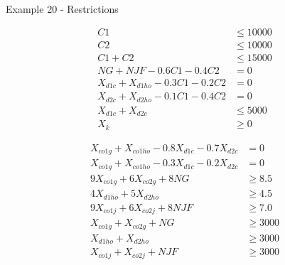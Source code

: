 \begin{frame}{Example 20 - Restrictions}

\begin{multicols}{2}
\tiny{
\begin{align*}
    C1 &\le 10000 \\
    C2 &\le 10000 \\
    C1 + C2 &\le 15000 \\
    NG + NJF - 0.6C1 - 0.4C2 &= 0 \\
    X_{d1c} + X_{d1ho} - 0.3C1 - 0.2C2 &= 0 \\
    X_{d2c} + X_{d2ho} - 0.1C1 - 0.4C2 &= 0 \\
    X_{d1c} + X_{d2c} &\le 5000 \\
    X_{k} &\ge 0
\end{align*}
}

\vfill
\columnbreak

\tiny{
\begin{align*}
    X_{co1g} + X_{co1ho} - 0.8X_{d1c} - 0.7X_{d2c} &= 0 \\
    X_{co1g} + X_{co1ho} - 0.3X_{d1c} - 0.2X_{d2c} &= 0 \\
    9X_{co1g} + 6X_{co2g} + 8NG &\ge 8.5 \\
    4X_{d1ho} + 5X_{d2ho} &\ge 4.5 \\
    9X_{co1j} + 6X_{co2j} + 8NJF &\ge 7.0 \\
    X_{co1g} + X_{co2g} + NG &\ge 3000 \\
    X_{d1ho} + X_{d2ho} &\ge 3000 \\
    X_{co1j} + X_{co2j} + NJF &\ge 3000
\end{align*}
}
\end{multicols}

\end{frame}
